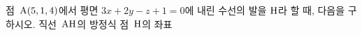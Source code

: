 점~$\mathrm{A}(5{,}\mkern3mu\mathopen{}1{,}\mkern3mu\mathopen{}4)$에서 평면 $3x+2y-z+1=0$에 내린 수선의 발을 $\mathrm{H}$라 할 때, 다음을 구하시오.
 직선~$\mathrm{AH}$의 방정식
 점~$\mathrm{H}$의 좌표
